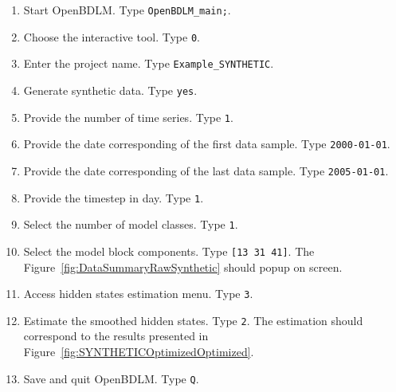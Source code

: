 \begin{enumerate}
\item Start OpenBDLM. Type \colorbox{light-gray}{\lstinline[basicstyle = \mlttfamily \small, backgroundcolor = \color{light-gray}]!OpenBDLM_main;!}.
\item Choose the interactive tool. Type \colorbox{light-gray}{\lstinline[basicstyle = \mlttfamily \small, backgroundcolor = \color{light-gray}]!0!}.
\item Enter the project name. Type \colorbox{light-gray}{\lstinline[basicstyle = \mlttfamily \small, backgroundcolor = \color{light-gray}]!Example_SYNTHETIC!}. 
\item Generate synthetic data. Type \colorbox{light-gray}{\lstinline[basicstyle = \mlttfamily \small, backgroundcolor = \color{light-gray}]!yes!}. 
\item Provide the number of time series. Type \colorbox{light-gray}{\lstinline[basicstyle = \mlttfamily \small, backgroundcolor = \color{light-gray}]!1!}.
\item Provide  the date corresponding of the first data sample. Type \colorbox{light-gray}{\lstinline[basicstyle = \mlttfamily \small, backgroundcolor = \color{light-gray}]!2000-01-01!}.
\item Provide  the date corresponding of the last data sample. Type \colorbox{light-gray}{\lstinline[basicstyle = \mlttfamily \small, backgroundcolor = \color{light-gray}]!2005-01-01!}.
\item Provide  the timestep in day. Type \colorbox{light-gray}{\lstinline[basicstyle = \mlttfamily \small, backgroundcolor = \color{light-gray}]!1!}.
\item Select the number of model classes. Type \colorbox{light-gray}{\lstinline[basicstyle = \mlttfamily \small, backgroundcolor = \color{light-gray}]!1!}. 
\item Select the model block components. Type \colorbox{light-gray}{\lstinline[basicstyle = \mlttfamily \small, backgroundcolor = \color{light-gray}]![13 31 41]!}. The Figure~\ref{fig:DataSummaryRawSynthetic} should popup on screen.
\item Access hidden states estimation menu. Type \colorbox{light-gray}{\lstinline[basicstyle = \mlttfamily \small, backgroundcolor = \color{light-gray}]!3!}. 
\item Estimate the smoothed hidden states. Type \colorbox{light-gray}{\lstinline[basicstyle = \mlttfamily \small, backgroundcolor = \color{light-gray}]!2!}. The estimation should correspond to the results presented in Figure~\ref{fig:SYNTHETICOptimizedOptimized}.
\item Save and quit OpenBDLM. Type \colorbox{light-gray}{\lstinline[basicstyle = \mlttfamily \small, backgroundcolor = \color{light-gray}]!Q!}.
\end{enumerate}



